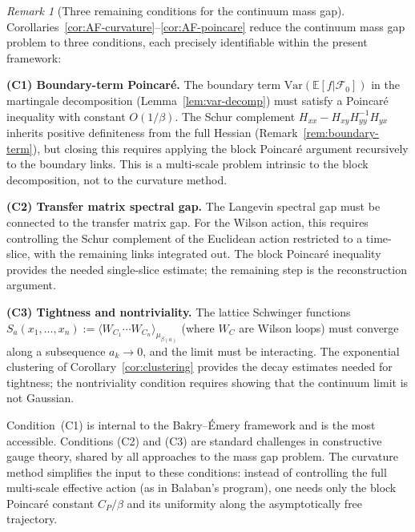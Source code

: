 \documentclass[11pt,a4paper]{article}
\theoremstyle{plain}
\theoremstyle{definition}
\theoremstyle{remark}
\newtheorem{remark}[theorem]{Remark}
\newcommand{\E}{\mathbb{E}}
\newcommand{\Var}{\mathrm{Var}}
\newcommand{\cF}{\mathcal{F}}
\begin{document}
\begin{remark}[Three remaining conditions for the continuum mass gap]
\label{rem:three-conditions}
Corollaries~\ref{cor:AF-curvature}--\ref{cor:AF-poincare} reduce
the continuum mass gap problem to three conditions, each precisely
identifiable within the present framework:

\medskip\noindent
\textbf{(C1) Boundary-term Poincar\'e.}
The boundary term $\Var(\E[f|\cF_0])$ in the martingale
decomposition (Lemma~\ref{lem:var-decomp}) must satisfy a
Poincar\'e inequality with constant $O(1/\beta)$.
The Schur complement $H_{xx} - H_{xy}H_{yy}^{-1}H_{yx}$
inherits positive definiteness from the full Hessian
(Remark~\ref{rem:boundary-term}), but closing this requires
applying the block Poincar\'e argument recursively to the
boundary links.  This is a multi-scale problem intrinsic
to the block decomposition, not to the curvature method.

\medskip\noindent
\textbf{(C2) Transfer matrix spectral gap.}
The Langevin spectral gap must be connected to the transfer
matrix gap.  For the Wilson action, this requires controlling
the Schur complement of the Euclidean action restricted to a
time-slice, with the remaining links integrated out.  The block
Poincar\'e inequality provides the needed single-slice estimate;
the remaining step is the reconstruction argument.

\medskip\noindent
\textbf{(C3) Tightness and nontriviality.}
The lattice Schwinger functions
$S_a(x_1, \ldots, x_n) :=
\langle W_{C_1} \cdots W_{C_n} \rangle_{\mu_{\beta(a)}}$
(where $W_C$ are Wilson loops) must converge along a subsequence
$a_k \to 0$, and the limit must be interacting.  The exponential
clustering of Corollary~\ref{cor:clustering} provides the decay
estimates needed for tightness; the nontriviality condition
requires showing that the continuum limit is not Gaussian.

\medskip
Condition~(C1) is internal to the Bakry--\'Emery framework and is the
most accessible.  Conditions (C2) and (C3) are standard challenges in
constructive gauge theory, shared by all approaches to the mass gap
problem.  The curvature method simplifies the input to these conditions:
instead of controlling the full multi-scale effective action (as in
Balaban's program), one needs only the block Poincar\'e constant
$C_P/\beta$ and its uniformity along the asymptotically free trajectory.
\end{remark}


\end{document}
